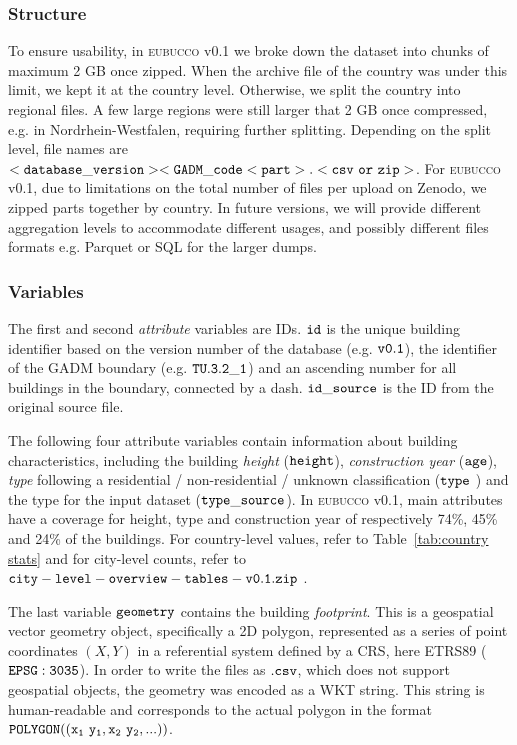 \documentclass[fleqn,10pt]{wlscirep}
\begin{document}
\subsubsection*{Structure}
To ensure usability, in \textsc{eubucco} v0.1 we broke down the dataset into chunks of maximum 2 GB once zipped. When the archive file of the country was under this limit, we kept it at the country level. Otherwise, we split the country into regional files. A few large regions were still larger that 2 GB once compressed, e.g. in Nordrhein-Westfalen, requiring further splitting. Depending on the split level, file names are ${\tt <database\_version>\-<GADM\_code\-<part>.<csv\ or\ zip>}$. For \textsc{eubucco} v0.1, due to limitations on the total number of files per upload on Zenodo, we zipped parts together by country. In future versions, we will provide different aggregation levels to accommodate different usages, and possibly different files formats e.g. Parquet or SQL for the larger dumps.

\subsubsection*{Variables}
The first and second \textit{attribute} variables are IDs.  ${\tt id}$ is the unique building identifier based on the version number of the database (e.g. ${\tt  v0.1}$), the identifier of the GADM boundary (e.g. ${\tt TU.3.2\_1}$) and an ascending number for all buildings in the boundary, connected by a dash. 
${\tt id\_source}$ is the ID from the original source file.
 
The following four attribute variables contain information about building characteristics, including the building \textit{height} (${\tt height}$), \textit{construction year} ($\tt{age}$), \textit{type} following a residential / non-residential / unknown classification (${\tt type}$ ) and the type for the input dataset (${\tt type\_source}$). In \textsc{eubucco} v0.1, main attributes have a coverage for height, type and construction year of respectively 74\%, 45\% and 24\% of the buildings. For country-level values, refer to  Table~\ref{tab:country stats}  and for city-level counts, refer to ${\tt city-level-overview-tables-v0.1.zip}$ .  

The last variable $\tt{geometry}$ contains the building \textit{footprint}. This is a geospatial vector geometry object, specifically a 2D polygon, represented as a series of point coordinates $(X,Y)$ in a referential system defined by a CRS, here ETRS89 ($\tt{EPSG:3035}$). In order to write the files as $\tt{.csv}$, which does not support geospatial objects, the geometry was encoded as a WKT string. This string is human-readable and corresponds to the actual polygon in the format $\tt{POLYGON ((x_1 \ y_1, x_2 \ y_2,...))}$. 
\end{document}
